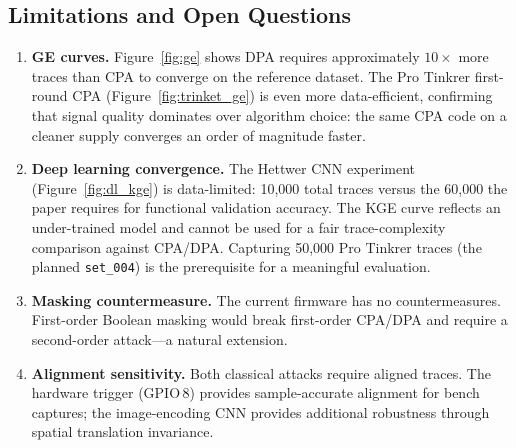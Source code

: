 \subsection{Limitations and Open Questions}

\begin{enumerate}
  \item \textbf{GE curves.}
    Figure~\ref{fig:ge} shows DPA requires approximately $10\times$ more
    traces than CPA to converge on the reference dataset.
    The Pro Tinkrer first-round CPA (Figure~\ref{fig:trinket_ge}) is even
    more data-efficient, confirming that signal quality dominates over
    algorithm choice: the same CPA code on a cleaner supply converges an
    order of magnitude faster.

  \item \textbf{Deep learning convergence.}
    The Hettwer CNN experiment (Figure~\ref{fig:dl_kge}) is data-limited:
    10{,}000 total traces versus the 60{,}000 the paper requires for
    functional validation accuracy.
    The KGE curve reflects an under-trained model and cannot be used for
    a fair trace-complexity comparison against CPA/DPA.
    Capturing 50{,}000 Pro Tinkrer traces (the planned \texttt{set\_004})
    is the prerequisite for a meaningful evaluation.

  \item \textbf{Masking countermeasure.}
    The current firmware has no countermeasures.
    First-order Boolean masking would break first-order CPA/DPA and
    require a second-order attack---a natural extension.

  \item \textbf{Alignment sensitivity.}
    Both classical attacks require aligned traces.
    The hardware trigger (GPIO\,8) provides sample-accurate alignment
    for bench captures; the image-encoding CNN provides additional
    robustness through spatial translation invariance.
\end{enumerate}
